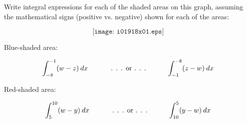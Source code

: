 

Write integral expressions for each of the shaded areas on this graph, assuming the mathematical signs (positive vs. negative) shown for each of the areas:

$$\texttt{[image: i01918x01.eps]}$$







Blue-shaded area:

$$\int_{-8}^{-1} (w - z) \> dx \hskip 30pt \hbox{ . . . or . . .} \hskip 30pt \int_{-1}^{-8} (z - w) \> dx$$

\vskip 30pt

Red-shaded area:

$$\int_{5}^{10} (w - y) \> dx \hskip 30pt \hbox{ . . . or . . .} \hskip 30pt \int_{10}^{5} (y - w) \> dx$$












